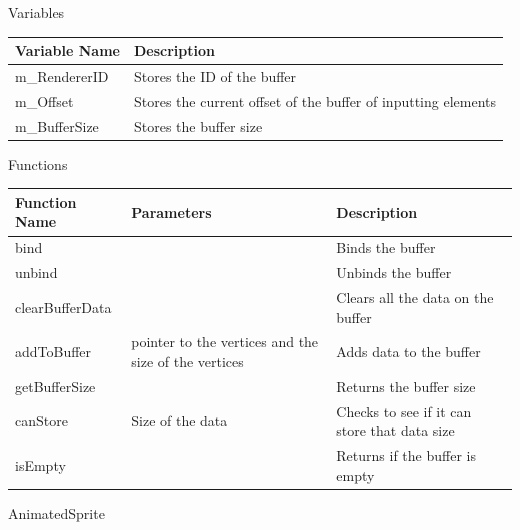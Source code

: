 \documentclass[../../Main.tex]{subfiles}
\begin{document}
    \begin{center}
        Variables
        \begin{tabular}{ | m{} | m{} | }
            \hline
            \textbf{Variable Name} & \textbf{Description} \\
            \hline
            m\_RendererID & Stores the ID of the buffer \\
            \hline
            m\_Offset & Stores the current offset of the buffer of inputting elements \\
            \hline
            m\_BufferSize & Stores the buffer size \\
            \hline
        \end{tabular}
        Functions
        \begin{tabular}{ | m{} | m{}| m{} | }
            \hline
            \textbf{Function Name} & \textbf{Parameters} & \textbf{Description} \\
            \hline
            bind & & Binds the buffer \\
            \hline
            unbind & & Unbinds the buffer \\
            \hline
            clearBufferData & & Clears all the data on the buffer \\
            \hline
            addToBuffer & pointer to the vertices and the size of the vertices & Adds data to the buffer \\
            \hline
            getBufferSize & & Returns the buffer size \\
            \hline
            canStore & Size of the data & Checks to see if it can store that data size \\
            \hline
            isEmpty & & Returns if the buffer is empty \\
            \hline
        \end{tabular}
    \end{center}
    AnimatedSprite
\end{document}
